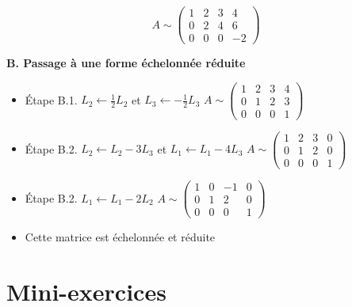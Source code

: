 \begin{frame}
\vspace*{-3ex}
$$A\sim\begin{pmatrix}1&2&3&4\\
0&2&4&6\\
0&0&0&-2
\end{pmatrix}$$

\pause

\textbf{B. Passage à une forme échelonnée réduite}

\pause

\begin{itemize}[<+->]
  \item \'Etape B.1. $L_2 \leftarrow \frac12 L_2$ et $L_3 \leftarrow -\frac12 L_3$ 
    \hfil
$A\sim\begin{pmatrix}1&2&3&4\\
0&1&2&3\\
0&0&0&1
\end{pmatrix}$  
  
  \item \'Etape B.2. $L_2 \leftarrow L_2-3L_3$ et $L_1 \leftarrow L_1 - 4L_3$
  \hfill\hfill
$A\sim\begin{pmatrix}1&2&3&0\\
0&1&2&0\\
0&0&0&1
\end{pmatrix}$ 

  \item \'Etape B.2. $L_1 \leftarrow L_1-2L_2$
  \hfil
  $A\sim\begin{pmatrix}1&0&-1&0\\
0&1&2&0\\
0&0&0&1
\end{pmatrix}$

  \item Cette matrice est échelonnée et réduite
\end{itemize}
\end{frame}








\section{Mini-exercices}

